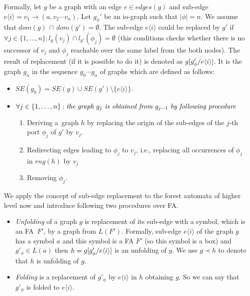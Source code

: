 Formally, let $g$ be a graph with an edge $e \in edges(g)$ and sub-edge $e\langle i\rangle = v_1 \rightarrow (a,v_2 \cdots v_n)$.
Let $g_{\phi}'$ be an io-graph such that $|\phi| = n$.
We assume that ${dom(g)}\, \cap\, {dom(g')} = \emptyset$.
The sub-edge $e\langle i\rangle$ could be replaced by $g'$ if $\forall j \in \{1,\ldots,n\}: l_{g}(v_j) \cap
l_{g'}(\phi_j) = \emptyset$
(this conditions checks whether there is no successor of $v_j$ and $\phi_j$ reachable over the same
label from the both nodes).
The result of replacement (if it is possible to do it) is denoted as $g[g'_\phi/e\langle i\rangle]$.
It is the graph $g_n$ in the sequence $g_0 \cdots g_n$ of graphs which are defined as follows: 
\begin{itemize}
	\item $SE(g_0) = SE(g) \cup SE(g') \setminus \{e\langle i\rangle\}$.
	\item $\forall j \in \{1, \ldots, n\}: \emph{the graph } g_j \emph{ is obtained from } g_{j-1} \emph{ by following procedure }$
		\begin{enumerate}
			\item Deriving a~graph $h$ by replacing the origin of the sub-edges of the $j$-th port $\phi_j$ of $g'$ by $v_j$.
			\item Redirecting edges leading to $\phi_{j}$ to $v_j$, i.e., replacing all occurrences of $\phi_j$ in $rng(h)$ by $v_j$
			\item Removing $\phi_j$. 
		\end{enumerate}
\end{itemize}

We apply the concept of sub-edge replacement to the forest automata of higher level now
and introduce following two procedures over FA.
\begin{itemize}
	\item \emph{Unfolding} of a graph $g$ is replacement of its sub-edge with a symbol, which is
		an FA~$F'$, by a graph from $L(F')$.
		Formally, sub-edge $e\langle i \rangle$ of the graph $g$ has a symbol $a$ and this symbol is a FA $F'$ (so this symbol is a box)
		and $g'_\phi \in L(a)$ then $h = g [g'_\phi/e\langle i \rangle]$ is an unfolding of $g$.
		We use $g \prec h$ to denote that $h$ is unfolding of $g$.
	\item \emph{Folding} is a replacement of $g'_\phi$ by $e \langle i \rangle$ in $h$ obtaining $g$.
		So we can say that $g'_\phi$ is folded to $e \langle i \rangle$. 
\end{itemize}

